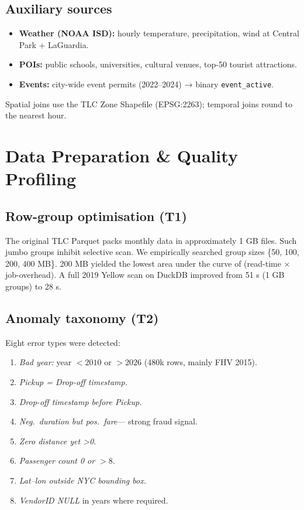 \documentclass[conference]{IEEEtran}
\begin{document}
\subsection{Auxiliary sources}
\begin{itemize}
\item \textbf{Weather (NOAA ISD):} hourly temperature, precipitation,
      wind at Central Park + LaGuardia.
\item \textbf{POIs:} public schools, universities, cultural venues,
      top-50 tourist attractions.
\item \textbf{Events:} city-wide event permits (2022–2024) → binary
      \texttt{event\_active}.
\end{itemize}

Spatial joins use the TLC Zone Shapefile (EPSG:2263);
temporal joins round to the nearest hour.

\section{Data Preparation \& Quality Profiling}\label{sec:prep}
\subsection{Row-group optimisation (T1)}
The original TLC Parquet
packs monthly data in approximately 1 GB files.
Such jumbo groups inhibit selective scan.
We empirically searched group sizes
\{50, 100, 200, 400 MB\}. 200 MB yielded
the lowest area under the curve of
(read-time × job-overhead). A full
2019 Yellow scan on DuckDB improved from
51 s (1 GB groups) to 28 s.

\subsection{Anomaly taxonomy (T2)}
Eight error types were detected:

\begin{enumerate}
\item \emph{Bad year:} year $<\!2010$ or $>\!2026$
      (480k rows, mainly FHV 2015).
\item \emph{Pickup = Drop-off timestamp.}
\item \emph{Drop-off timestamp before Pickup.}
\item \emph{Neg.\ duration but pos.\ fare}—
      strong fraud signal.
\item \emph{Zero distance yet \textgreater0}.    
\item \emph{Passenger count 0 or $>\!8$}.    
\item \emph{Lat–lon outside NYC bounding box.}
\item \emph{VendorID NULL} in years where required.
\end{enumerate}
\end{document}
